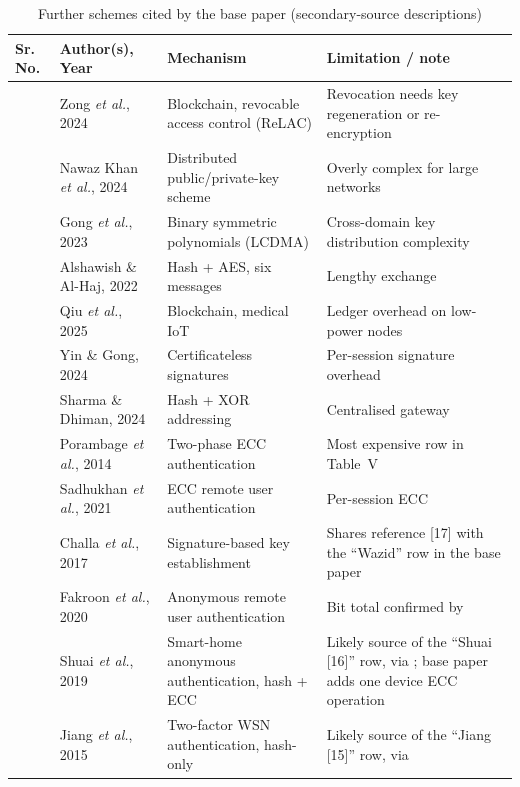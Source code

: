 \documentclass[12pt,a4paper,oneside]{report}
\numberwithin{equation}{chapter}
\begin{document}
\begin{table}[H]
\centering
\caption{Further schemes cited by the base paper (secondary-source descriptions)}
\label{tab:lit2}
\small
\begin{tabularx}{\textwidth}{|>{\centering\arraybackslash}p{}|P{0.2\textwidth}|P{0.24\textwidth}|Y|}
\hline
\textbf{Sr. No.} & \textbf{Author(s), Year} & \textbf{Mechanism} & \textbf{Limitation / note}\\  & Zong \emph{et al.}, 2024 \cite{zong2024relac} & Blockchain, revocable access control (ReLAC) & Revocation needs key regeneration or re-encryption\\  & Nawaz Khan \emph{et al.}, 2024 \cite{khan2024enabling} & Distributed public/private-key scheme & Overly complex for large networks\\  & Gong \emph{et al.}, 2023 \cite{gong2023lcdma} & Binary symmetric polynomials (LCDMA) & Cross-domain key distribution complexity\\  & Alshawish \& Al-Haj, 2022 \cite{alshawish2022efficient} & Hash + AES, six messages & Lengthy exchange\\  & Qiu \emph{et al.}, 2025 \cite{qiu2025lightweight} & Blockchain, medical IoT & Ledger overhead on low-power nodes\\  & Yin \& Gong, 2024 \cite{yin2024lightweight} & Certificateless signatures & Per-session signature overhead\\  & Sharma \& Dhiman, 2024 \cite{sharma2024secure} & Hash + XOR addressing & Centralised gateway\\  & Porambage \emph{et al.}, 2014 \cite{porambage2014two} & Two-phase ECC authentication & Most expensive row in Table~V\\  & Sadhukhan \emph{et al.}, 2021 \cite{sadhukhan2021lightweight} & ECC remote user authentication & Per-session ECC\\  & Challa \emph{et al.}, 2017 \cite{challa2017secure} & Signature-based key establishment & Shares reference [17] with the ``Wazid'' row in the base paper\\  & Fakroon \emph{et al.}, 2020 \cite{fakroon2020secure} & Anonymous remote user authentication & Bit total confirmed by \cite{banerjee2020efficient}\\  & Shuai \emph{et al.}, 2019 \cite{shuai2019anonymous} & Smart-home anonymous authentication, hash + ECC & Likely source of the ``Shuai [16]'' row, via \cite{banerjee2020efficient}; base paper adds one device ECC operation\\  & Jiang \emph{et al.}, 2015 \cite{jiang2015twofactor} & Two-factor WSN authentication, hash-only & Likely source of the ``Jiang [15]'' row, via \cite{zhong2025lightweight}\\ \hline
\end{tabularx}
\end{table}
\end{document}
